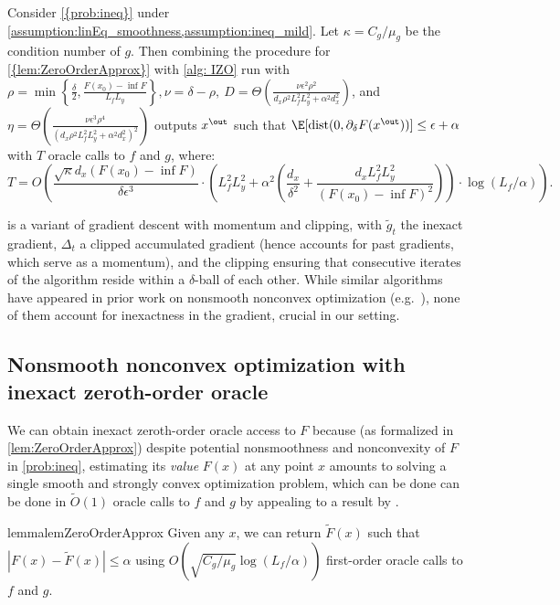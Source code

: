 \begin{theorem}\label{thm:izo_complete_guarantees}
    Consider \cref{{prob:ineq}} under \cref{assumption:linEq_smoothness,assumption:ineq_mild}.  Let $\kappa=C_g/\mu_g$ be the condition number of $g$. Then combining  the procedure for \cref{{lem:ZeroOrderApprox}}
with \cref{alg: IZO} run with 
$\rho=\min\left\{\tfrac{\delta}{2},\tfrac{F(x_0)-\inf F}{L_fL_y}\right\},\nu=\delta-\rho,~D=\Theta\left(\frac{\nu\epsilon^2\rho^2}{d_x\rho^2 L_f^2L_y^2+\alpha^2 d_x^2}\right)$, and $\eta=\Theta\left(\frac{\nu\epsilon^3\rho^4}{(d_x\rho^2L_f^2L_y^2+\alpha^2d_x^2)^2}\right)$ 
outputs $x^{\out}$ such that $\E[\mathrm{dist}(0,{\partial}_\delta F(x^{\out}))]\leq\epsilon+\alpha$ with $T$ { oracle calls to } $f$ { and } $g$, where:
\[T=
O\left(\frac{\sqrt{\kappa}d_x(F(x_0)-\inf F)}{\delta\epsilon^3}\cdot \left(L_f^2L_y^2+\alpha^2 \left(\frac{d_x}{\delta^{2}}+\frac{d_x L_f^2L_y^2}{(F(x_0)-\inf F)^2}\right)\right)\cdot\log(L_f/\alpha)\right).
\]  
\end{theorem}
 is a variant of gradient descent with momentum and clipping, with $\widetilde{g}_t$ the inexact gradient, $\Delta_t$ a clipped accumulated gradient (hence accounts for past gradients, which serve as a momentum), and  the clipping ensuring that consecutive iterates of the algorithm reside within a $\delta$-ball of each other. While similar algorithms have appeared in prior work on nonsmooth nonconvex optimization (e.g.~\cite{cutkosky2023optimal}), none of them account for inexactness in the gradient, crucial in our setting.

\subsection{Nonsmooth nonconvex optimization with inexact zeroth-order oracle}\label{sec:ncns_inexact_ZO}
We can obtain inexact zeroth-order oracle access to $F$  because (as formalized in \cref{lem:ZeroOrderApprox}) despite potential nonsmoothness and nonconvexity of  $F$ in \cref{prob:ineq},  estimating its \emph{value} $F(x)$  at any point $x$ amounts to solving a single smooth and strongly convex optimization problem, which can be done can be done in $\widetilde{O}(1)$ oracle calls to $f$ and $g$ by appealing to a result by \citet{zhang2022solving}.

\begin{restatable}{lemma}{lemZeroOrderApprox}\label{lem:ZeroOrderApprox}
    Given any $x$, we can return $\widetilde{F}(x)$ such that $|F(x)-\widetilde{F}(x)|\leq\alpha$ using $O(\sqrt{C_g/\mu_g}\log(L_f/\alpha))$ first-order oracle calls to $f$ and $g$.
\end{restatable}


